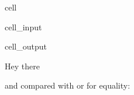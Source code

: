 \documentclass[a4paper,10pt,english]{jupyterBook}
\begin{document}
\begin{sphinxuseclass}{cell}\begin{sphinxVerbatimInput}

\begin{sphinxuseclass}{cell_input}
\begin{sphinxVerbatim}[commandchars=\\\{\}]
\end{sphinxVerbatim}

\end{sphinxuseclass}\end{sphinxVerbatimInput}
\begin{sphinxVerbatimOutput}

\begin{sphinxuseclass}{cell_output}
\begin{sphinxVerbatim}[commandchars=\\\{\}]
Hey there
\end{sphinxVerbatim}

\end{sphinxuseclass}\end{sphinxVerbatimOutput}

\end{sphinxuseclass}
\sphinxAtStartPar
and compared with \sphinxcode{\sphinxupquote{==}} or \sphinxcode{\sphinxupquote{!=}} for equality:
\end{document}
